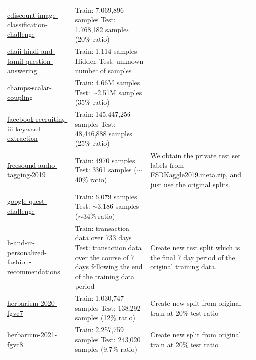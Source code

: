 \documentclass{article} %
\begin{document}
\begin{longtable}{m{4cm} m{4.5cm} m{4cm}}
    \href{https://www.kaggle.com/c/cdiscount-image-classification-challenge}{cdiscount-image-classification-challenge} &  Train: 7,069,896 samples \newline  Test: 1,768,182 samples (20\% ratio) & \\
    \href{https://www.kaggle.com/c/chaii-hindi-and-tamil-question-answering}{chaii-hindi-and-tamil-question-answering} &  Train: 1,114 samples \newline Hidden  Test: unknown number of samples & \\
    \href{https://www.kaggle.com/c/champs-scalar-coupling}{champs-scalar-coupling} &  Train: 4.66M samples \newline  Test: $\sim$2.51M samples (35\% ratio) & \\
    \href{https://www.kaggle.com/c/facebook-recruiting-iii-keyword-extraction}{facebook-recruiting-iii-keyword-extraction} &  Train: 145,447,256 samples \newline  Test: 48,446,888 samples (25\% ratio) & \\
    \href{https://www.kaggle.com/c/freesound-audio-tagging-2019}{freesound-audio-tagging-2019} &  Train: 4970 samples \newline  Test: 3361 samples ($\sim$40\% ratio) & We obtain the private test set labels from FSDKaggle2019.meta.zip, and just use the original splits. \\
    \href{https://www.kaggle.com/c/google-quest-challenge}{google-quest-challenge} &  Train: 6,079 samples \newline  Test: $\sim$3,186 samples ($\sim$34\% ratio) & \\
    \href{https://www.kaggle.com/c/h-and-m-personalized-fashion-recommendations}{h-and-m-personalized-fashion-recommendations} &  Train: transaction data over 733 days \newline  Test: transaction data over the course of 7 days following the end of the training data period & Create new test split which is the final 7 day period of the original training data. \\
    \href{https://www.kaggle.com/c/herbarium-2020-fgvc7}{herbarium-2020-fgvc7} &  Train: 1,030,747 samples \newline  Test: 138,292 samples (12\% ratio) & Create new split from original train at 20\% test ratio \\
    \href{https://www.kaggle.com/c/herbarium-2021-fgvc8}{herbarium-2021-fgvc8} &  Train: 2,257,759 samples \newline  Test: 243,020 samples (9.7\% ratio) & Create new split from original train at 20\% test ratio \\

\end{longtable}
\end{document}
